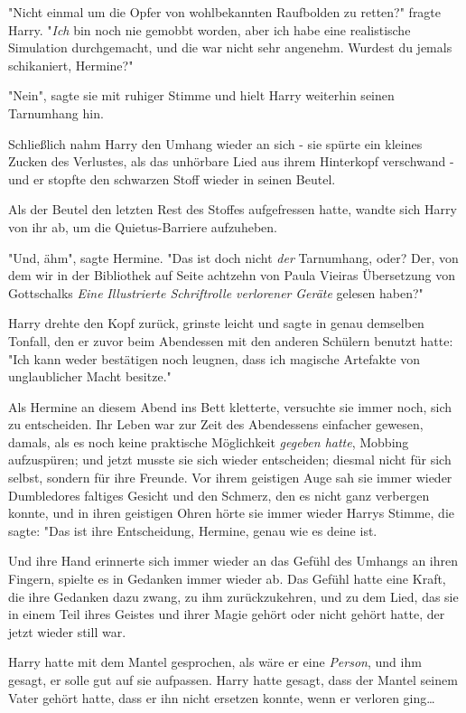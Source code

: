 {"Nicht einmal um die Opfer von wohlbekannten Raufbolden zu retten?" fragte Harry. "\emph{Ich} bin noch nie gemobbt worden, aber ich habe eine realistische Simulation durchgemacht, und die war nicht sehr angenehm. Wurdest du jemals schikaniert, Hermine?"

"Nein", sagte sie mit ruhiger Stimme und hielt Harry weiterhin seinen Tarnumhang hin.

Schließlich nahm Harry den Umhang wieder an sich - sie spürte ein kleines Zucken des Verlustes, als das unhörbare Lied aus ihrem Hinterkopf verschwand - und er stopfte den schwarzen Stoff wieder in seinen Beutel.

Als der Beutel den letzten Rest des Stoffes aufgefressen hatte, wandte sich Harry von ihr ab, um die Quietus-Barriere aufzuheben.

"Und, ähm", sagte Hermine. "Das ist doch nicht \emph{der} Tarnumhang, oder? Der, von dem wir in der Bibliothek auf Seite achtzehn von Paula Vieiras Übersetzung von Gottschalks \emph{Eine} \emph{Illustrierte Schriftrolle verlorener} \emph{Geräte} gelesen haben?"

Harry drehte den Kopf zurück, grinste leicht und sagte in genau demselben Tonfall, den er zuvor beim Abendessen mit den anderen Schülern benutzt hatte: "Ich kann weder bestätigen noch leugnen, dass ich magische Artefakte von unglaublicher Macht besitze."

Als Hermine an diesem Abend ins Bett kletterte, versuchte sie immer noch, sich zu entscheiden. Ihr Leben war zur Zeit des Abendessens einfacher gewesen, damals, als es noch keine praktische Möglichkeit \emph{gegeben hatte}, Mobbing aufzuspüren; und jetzt musste sie sich wieder entscheiden; diesmal nicht für sich selbst, sondern für ihre Freunde. Vor ihrem geistigen Auge sah sie immer wieder Dumbledores faltiges Gesicht und den Schmerz, den es nicht ganz verbergen konnte, und in ihren geistigen Ohren hörte sie immer wieder Harrys Stimme, die sagte: "Das ist ihre Entscheidung, Hermine, genau wie es deine ist.

Und ihre Hand erinnerte sich immer wieder an das Gefühl des Umhangs an ihren Fingern, spielte es in Gedanken immer wieder ab. Das Gefühl hatte eine Kraft, die ihre Gedanken dazu zwang, zu ihm zurückzukehren, und zu dem Lied, das sie in einem Teil ihres Geistes und ihrer Magie gehört oder nicht gehört hatte, der jetzt wieder still war.

Harry hatte mit dem Mantel gesprochen, als wäre er eine \emph{Person}, und ihm gesagt, er solle gut auf sie aufpassen. Harry hatte gesagt, dass der Mantel seinem Vater gehört hatte, dass er ihn nicht ersetzen konnte, wenn er verloren ging…

}
